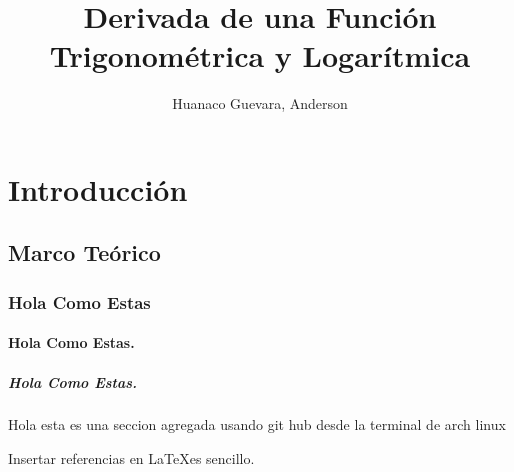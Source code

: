 \documentclass[a4paper, 11pt]{report}
\title{Derivada de una Función Trigonométrica y Logarítmica}
\author{Huanaco Guevara, Anderson}
\begin{document}

\newpage
\tableofcontents
\thispagestyle{empty}
\newpage
\setcounter{page}{1}

\chapter{Introducción}
\lipsum[1-2]

\section{Marco Teórico}

\lipsum[1-2]
\subsection{Hola Como Estas}
\lipsum[1-2]

\subsubsection{Hola Como Estas.}
\lipsum[1-2]

\paragraph{Hola Como Estas.}
\lipsum[1-2]


Hola esta es una seccion agregada usando git hub desde la terminal de arch linux

Insertar referencias en \LaTeX es sencillo. \cite{castrillon2014mecanica}





\end{document}
